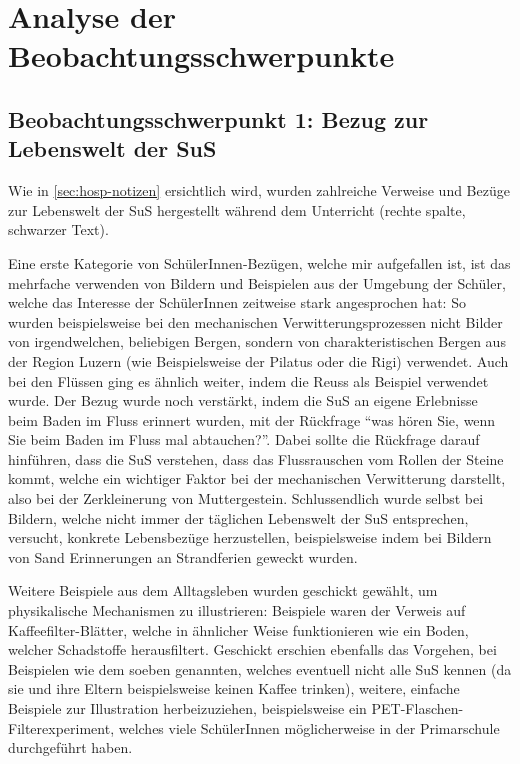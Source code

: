 \section{Analyse der Beobachtungsschwerpunkte}
\subsection{Beobachtungsschwerpunkt 1: Bezug zur Lebenswelt der SuS}

Wie in \cref{sec:hosp-notizen} ersichtlich wird, wurden zahlreiche Verweise und Bezüge zur Lebenswelt der SuS hergestellt während dem Unterricht (rechte spalte, schwarzer Text).

Eine erste Kategorie von SchülerInnen-Bezügen, welche mir aufgefallen ist, ist das mehrfache verwenden von Bildern und Beispielen aus der Umgebung der Schüler, welche das Interesse der SchülerInnen zeitweise stark angesprochen hat: So wurden beispielsweise bei den mechanischen Verwitterungsprozessen nicht Bilder von irgendwelchen, beliebigen Bergen, sondern von charakteristischen Bergen aus der Region Luzern (wie Beispielsweise der Pilatus oder die Rigi) verwendet. Auch bei den Flüssen ging es ähnlich weiter, indem die Reuss als Beispiel verwendet wurde. Der Bezug wurde noch verstärkt, indem die SuS an eigene Erlebnisse beim Baden im Fluss erinnert wurden, mit der Rückfrage ``was hören Sie, wenn Sie beim Baden im Fluss mal abtauchen?''. Dabei sollte die Rückfrage darauf hinführen, dass die SuS verstehen, dass das Flussrauschen vom Rollen der Steine kommt, welche ein wichtiger Faktor bei der mechanischen Verwitterung darstellt, also bei der Zerkleinerung von Muttergestein. Schlussendlich wurde selbst bei Bildern, welche nicht immer der täglichen Lebenswelt der SuS entsprechen, versucht, konkrete Lebensbezüge herzustellen, beispielsweise indem bei Bildern von Sand Erinnerungen an Strandferien geweckt wurden. 

Weitere Beispiele aus dem Alltagsleben wurden geschickt gewählt, um physikalische Mechanismen zu illustrieren: Beispiele waren der Verweis auf Kaffeefilter-Blätter, welche in ähnlicher Weise funktionieren wie ein Boden, welcher Schadstoffe herausfiltert. Geschickt erschien ebenfalls das Vorgehen, bei Beispielen wie dem soeben genannten, welches eventuell nicht alle SuS kennen (da sie und ihre Eltern beispielsweise keinen Kaffee trinken), weitere, einfache Beispiele zur Illustration herbeizuziehen, beispielsweise ein PET-Flaschen-Filterexperiment, welches viele SchülerInnen möglicherweise in der Primarschule durchgeführt haben.

